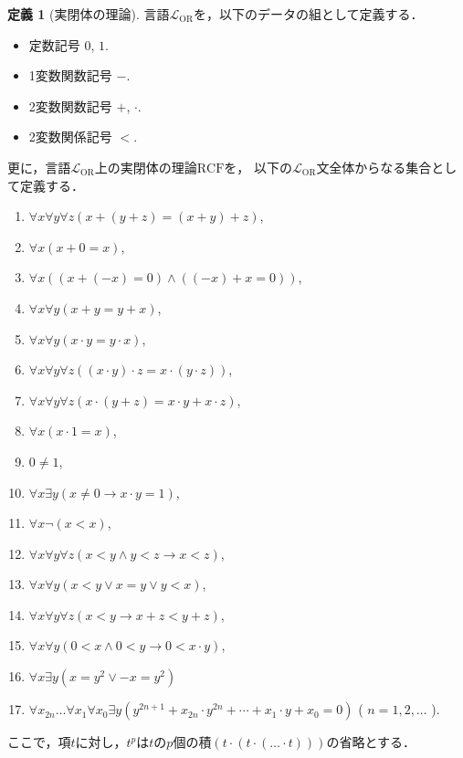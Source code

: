 \documentclass[uplatex, dvipdfmx]{jsarticle}
\numberwithin{equation}{section}
\newcommand{\RCF}{\mathrm{RCF}}
\theoremstyle{definition}
\newtheorem{definition}{定義}[section]
\begin{document}
\begin{definition}[実閉体の理論]
     言語$\mathcal{L}_\mathrm{OR}$を，以下のデータの組として定義する．
     \begin{itemize}
          \item 定数記号 $0$, $1$.
          \item 1変数関数記号 $-$.
          \item 2変数関数記号 $+$, $\cdot$.
          \item 2変数関係記号 $<$.
     \end{itemize}
     更に，言語$\mathcal{L}_\mathrm{OR}$上の実閉体の理論$\RCF$を，
     以下の$\mathcal{L}_\mathrm{OR}$文全体からなる集合として定義する．
          \begin{enumerate}
               \item $\forall x \forall y \forall z(x + (y + z) = (x + y) + z)$,
               \item $\forall x (x + 0 = x)$,
               \item $\forall x ((x + (-x) = 0)\land((-x) + x = 0))$,
               \item $\forall x \forall y (x + y = y + x)$,
               \item $\forall x \forall y (x \cdot y = y \cdot x)$,
               \item $\forall x \forall y \forall z((x \cdot y) \cdot z = x \cdot (y \cdot z))$,
               \item $\forall x \forall y \forall z(x \cdot (y + z) = x \cdot y + x \cdot z)$,
               \item $\forall x (x \cdot 1 = x)$,
               \item $0 \neq 1$,
               \item $\forall x \exists y (x \neq 0 \rightarrow x \cdot y = 1)$,
               \item $\forall x \lnot (x < x)$,
               \item $\forall x \forall y \forall z(x < y \land y < z \rightarrow x < z)$,
               \item $\forall x \forall y (x < y \lor x = y \lor y < x)$,
               \item $\forall x \forall y \forall z(x < y \rightarrow x + z < y + z)$,
               \item $\forall x \forall y (0 < x \land 0 < y \rightarrow 0 < x \cdot y)$,
               \item $\forall x \exists y (x = y^2 \lor -x = y^2)$
               \item $\forall x_{2n} \dots \forall x_1 \forall x_0 \exists y (y^{2n+1} + x_{2n} \cdot y^{2n} + \cdots + x_1 \cdot y + x_0 = 0)$ ( $n =  1, 2 , \dots$ ).
          \end{enumerate}

     ここで，項$t$に対し，$t^p$は$t$の$p$個の積$(t\cdot(t\cdot(\dots \cdot t)))$の省略とする．
\end{definition}
\end{document}
